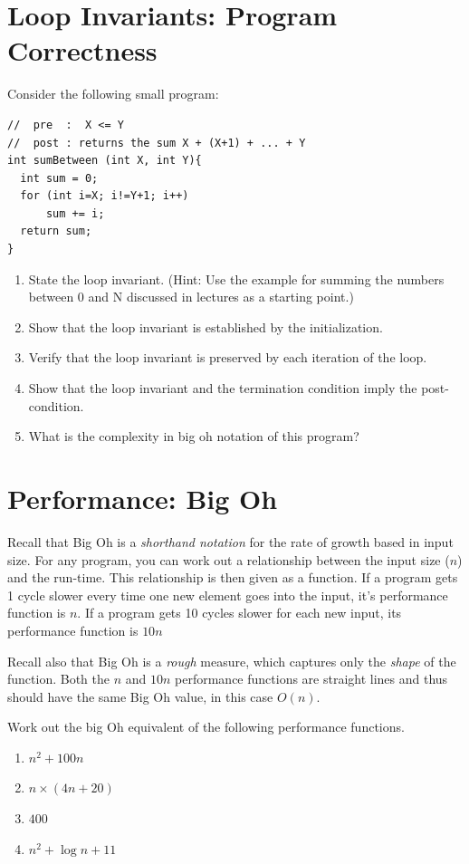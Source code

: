 \documentclass[twoside=false,DIV=14]{scrartcl}
\begin{document}
\section{Loop Invariants: Program Correctness}  
Consider the following small program:
 
 \begin{verbatim}      
//  pre  :  X <= Y
//  post : returns the sum X + (X+1) + ... + Y 
int sumBetween (int X, int Y){
  int sum = 0;
  for (int i=X; i!=Y+1; i++)
      sum += i;
  return sum;
}
\end{verbatim}
    
\begin{enumerate}
\item    State the loop invariant. (Hint: Use the example for summing the numbers between 0 and N  discussed in lectures as a starting point.)
 \item   Show that the loop invariant is established by the initialization.
  \item  Verify that the loop invariant is preserved by each iteration of the loop.
  \item  Show that the loop invariant and the termination condition imply the post-condition. 
  \item What is the complexity in big oh notation of this program?
\end{enumerate}

\section{Performance: Big Oh}
Recall that Big Oh is a \emph{shorthand notation} for the rate of growth based in input size. For any program, you can work out a relationship between the input size ($n$) and the run-time.  This relationship is then given as a function.  If a program gets 1 cycle slower every time one new element goes into the input, it's performance function is $n$.  If a program gets 10 cycles slower for each new input, its performance function is $10n$

Recall also that Big Oh is a \emph{rough} measure, which captures only the \emph{shape} of the function.  Both the $n$ and $10n$ performance functions are straight lines and thus should have the same Big Oh value, in this case $O(n)$.  

Work out the big Oh equivalent of the following performance functions.

\begin{enumerate}
\item $n^2 + 100n$
\item $n\times (4n + 20)$

\item $400$

\item $n^2 + \log n + 11$
\end{enumerate}
\end{document}
